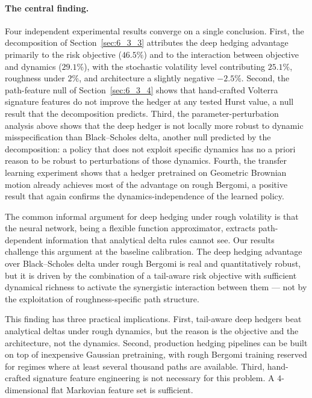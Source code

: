 \documentclass[12pt,a4paper]{article}
\theoremstyle{definition}
\theoremstyle{plain}
\theoremstyle{remark}
\theoremstyle{plain}
\begin{document}
\paragraph{The central finding.}
Four independent experimental results converge on a single
conclusion. First, the decomposition of Section~\ref{sec:6_3_3}
attributes the deep hedging advantage primarily to the risk objective
($46.5\%$) and to the interaction between objective and dynamics ($29.1\%$), with the stochastic volatility level contributing $25.1\%$, roughness under $2\%$, and architecture a slightly negative $-2.5\%$. Second, the path-feature
null of Section~\ref{sec:6_3_4} shows that hand-crafted Volterra
signature features do not improve the hedger at any tested Hurst
value, a null result that the decomposition predicts. Third,
the parameter-perturbation analysis above shows that the deep
hedger is not locally more robust to dynamic misspecification
than Black--Scholes delta, another null predicted by the
decomposition: a policy that does not exploit specific dynamics
has no a priori reason to be robust to perturbations of those
dynamics. Fourth, the transfer learning experiment shows that a
hedger pretrained on Geometric Brownian motion already achieves
most of the advantage on rough Bergomi, a positive result that
again confirms the dynamics-independence of the learned policy.

The common informal argument for deep hedging under rough
volatility is that the neural network, being a flexible function
approximator, extracts path-dependent information that
analytical delta rules cannot see. Our results challenge this
argument at the baseline calibration. The deep hedging advantage
over Black--Scholes delta under rough Bergomi is real and
quantitatively robust, but it is driven by the combination of a
tail-aware risk objective with sufficient dynamical richness to
activate the synergistic interaction between them --- not by the
exploitation of roughness-specific path structure.

This finding has three practical implications. First, tail-aware
deep hedgers beat analytical deltas under rough dynamics, but
the reason is the objective and the architecture, not the
dynamics. Second, production hedging pipelines can be built on
top of inexpensive Gaussian pretraining, with rough Bergomi
training reserved for regimes where at least several thousand
paths are available. Third, hand-crafted signature feature
engineering is not necessary for this problem. A $4$-dimensional
flat Markovian feature set is sufficient.
\end{document}
